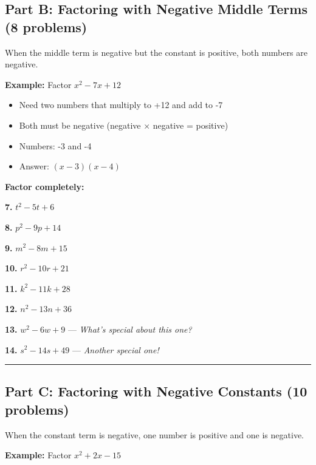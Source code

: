 \documentclass[
  11pt,
]{article}
\providecommand{\tightlist}{%
  \setlength{\itemsep}{0pt}\setlength{\parskip}{0pt}}
\begin{document}
\hypertarget{part-b-factoring-with-negative-middle-terms-8-problems}{%
\subsection{Part B: Factoring with Negative Middle Terms (8
problems)}\label{part-b-factoring-with-negative-middle-terms-8-problems}}

When the middle term is negative but the constant is positive, both
numbers are negative.

\textbf{Example:} Factor \(x^2 - 7x + 12\)

\begin{itemize}
\tightlist
\item
  Need two numbers that multiply to +12 and add to -7
\item
  Both must be negative (negative × negative = positive)
\item
  Numbers: -3 and -4
\item
  Answer: \((x - 3)(x - 4)\)
\end{itemize}

\textbf{Factor completely:}

\textbf{7.} \(t^2 - 5t + 6\)

\textbf{8.} \(p^2 - 9p + 14\)

\textbf{9.} \(m^2 - 8m + 15\)

\textbf{10.} \(r^2 - 10r + 21\)

\textbf{11.} \(k^2 - 11k + 28\)

\textbf{12.} \(n^2 - 13n + 36\)

\textbf{13.} \(w^2 - 6w + 9\) --- \emph{What's special about this one?}

\textbf{14.} \(s^2 - 14s + 49\) --- \emph{Another special one!}

\begin{center}\rule{0.5\linewidth}{0.5pt}\end{center}

\hypertarget{part-c-factoring-with-negative-constants-10-problems}{%
\subsection{Part C: Factoring with Negative Constants (10
problems)}\label{part-c-factoring-with-negative-constants-10-problems}}

When the constant term is negative, one number is positive and one is
negative.

\textbf{Example:} Factor \(x^2 + 2x - 15\)
\end{document}
